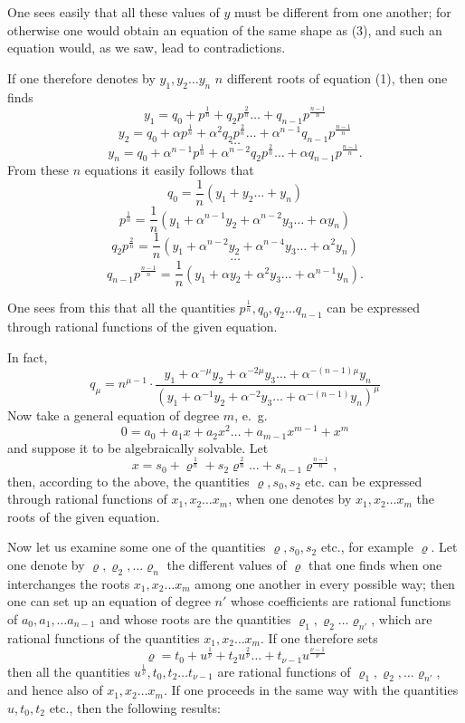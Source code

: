 \documentclass{article}
\begin{document}
One sees easily that all these values of $y$ must be different from one another; for otherwise one would obtain an equation of the same shape as (3), and such an equation would, as we saw, lead to contradictions.

If one therefore denotes by $y_1, y_2 \ldots y_n$ $n$ different roots of equation (1), then one finds
\[ y_1 = q_0 + p^{\frac{1}{n}} + q_2 p^{\frac{2}{n}} \ldots + q_{n-1} p^{\frac{n-1}{n}} \]
\[ y_2 = q_0 + \alpha p^{\frac{1}{n}} + \alpha^{2} q_2 p^{\frac{2}{n}} \ldots + \alpha^{n-1} q_{n-1} p^{\frac{n-1}{n}} \]
\[ \ldots \]
\[ y_n = q_0 + \alpha^{n-1} p^{\frac{1}{n}} + \alpha^{n-2} q_2 p^{\frac{2}{n}} \ldots + \alpha q_{n-1} p^{\frac{n-1}{n}}. \]
From these $n$ equations it easily follows that
\[ q_0 = \frac{1}{n}(y_1 + y_2 \ldots + y_n) \]
\[ p^{\frac{1}{n}} = \frac{1}{n}(y_1 + \alpha^{n-1} y_2 + \alpha^{n-2} y_3 \ldots + \alpha y_n) \]
\[ q_2 p^{\frac{2}{n}} = \frac{1}{n}(y_1 + \alpha^{n-2} y_2 + \alpha^{n-4} y_3 \ldots + \alpha^{2} y_n) \]
\[ \ldots \]
\[ q_{n-1} p^{\frac{n-1}{n}} = \frac{1}{n}(y_1 + \alpha y_2 + \alpha^{2} y_3 \ldots + \alpha^{n-1} y_n). \]

One sees from this that all the quantities $p^{\frac{1}{n}}, q_0, q_2 \ldots q_{n-1}$ can be expressed through rational functions of the given equation.

In fact,
\[ q_\mu = n^{\mu-1} \cdot \frac{y_1 + \alpha^{-\mu} y_2 + \alpha^{-2\mu} y_3 \ldots + \alpha^{-(n-1)\mu} y_n}{(y_1 + \alpha^{-1} y_2 + \alpha^{-2} y_3 \ldots + \alpha^{-(n-1)} y_n)^{\mu}} \]
Now take a general equation of degree $m$, e.\ g.
\[ 0 = a_0 + a_1 x + a_2 x^{2} \ldots + a_{m-1} x^{m-1} + x^{m} \]
and suppose it to be algebraically solvable. Let
\[ x = s_0 + \varrho^{\frac{1}{n}} + s_2 \varrho^{\frac{2}{n}} \ldots + s_{n-1} \varrho^{\frac{n-1}{n}}, \]
then, according to the above, the quantities $\varrho, s_0, s_2$ etc. can be expressed through rational functions of $x_1, x_2 \ldots x_m$, when one denotes by $x_1, x_2 \ldots x_m$ the roots of the given equation.

Now let us examine some one of the quantities $\varrho, s_0, s_2$ etc., for example $\varrho$. Let one denote by $\varrho, \varrho_2, \ldots \varrho_n$ the different values of $\varrho$ that one finds when one interchanges the roots $x_1, x_2 \ldots x_m$ among one another in every possible way; then one can set up an equation of degree $n'$ whose coefficients are rational functions of $a_0, a_1, \ldots a_{n-1}$ and whose roots are the quantities $\varrho_1, \varrho_2 \ldots \varrho_{n'}$, which are rational functions of the quantities $x_1, x_2 \ldots x_m$. If one therefore sets
\[ \varrho = t_0 + u^{\frac{1}{\nu}} + t_2 u^{\frac{2}{\nu}} \ldots + t_{\nu-1} u^{\frac{\nu-1}{\nu}} \]
then all the quantities $u^{\frac{1}{\nu}}, t_0, t_2 \ldots t_{\nu-1}$ are rational functions of $\varrho_1, \varrho_2, \ldots \varrho_{n'}$, and hence also of $x_1, x_2 \ldots x_m$. If one proceeds in the same way with the quantities $u, t_0, t_2$ etc., then the following results:
\end{document}
